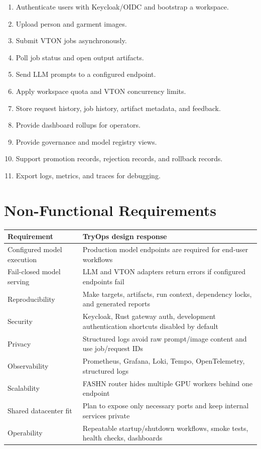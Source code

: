 \documentclass[12pt,a4paper,oneside]{report}
\begin{document}
\begin{enumerate}
  \item Authenticate users with Keycloak/OIDC and bootstrap a workspace.
  \item Upload person and garment images.
  \item Submit VTON jobs asynchronously.
  \item Poll job status and open output artifacts.
  \item Send LLM prompts to a configured endpoint.
  \item Apply workspace quota and VTON concurrency limits.
  \item Store request history, job history, artifact metadata, and feedback.
  \item Provide dashboard rollups for operators.
  \item Provide governance and model registry views.
  \item Support promotion records, rejection records, and rollback records.
  \item Export logs, metrics, and traces for debugging.
\end{enumerate}

\section{Non-Functional Requirements}

\begin{longtable}{p{4.2cm}p{10.5cm}}
\toprule
\textbf{Requirement} & \textbf{TryOps design response} \\
\midrule
Configured model execution & Production model endpoints are required for end-user workflows \\
Fail-closed model serving & LLM and VTON adapters return errors if configured endpoints fail \\
Reproducibility & Make targets, artifacts, run context, dependency locks, and generated reports \\
Security & Keycloak, Rust gateway auth, development authentication shortcuts disabled by default \\
Privacy & Structured logs avoid raw prompt/image content and use job/request IDs \\
Observability & Prometheus, Grafana, Loki, Tempo, OpenTelemetry, structured logs \\
Scalability & FASHN router hides multiple GPU workers behind one endpoint \\
Shared datacenter fit & Plan to expose only necessary ports and keep internal services private \\
Operability & Repeatable startup/shutdown workflows, smoke tests, health checks, dashboards \\
\bottomrule
\end{longtable}
\end{document}
